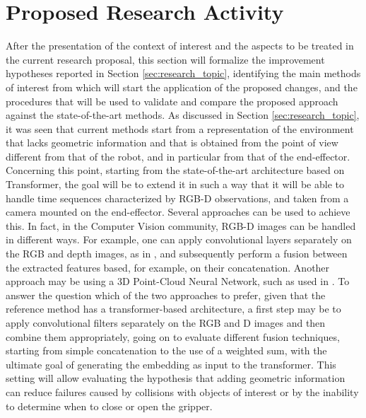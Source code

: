 \section{Proposed Research Activity}
\label{sec:research_activity}
After the presentation of the context of interest and the aspects to be treated in the current research proposal, this section will formalize the improvement hypotheses reported in Section \ref{sec:research_topic}, identifying the main methods of interest from which will start the application of the proposed changes, and the procedures that will be used to validate and compare the proposed approach against the state-of-the-art methods.
\newline As discussed in Section \ref{sec:research_topic}, it was seen that current methods start from a representation of the environment that lacks geometric information and that is obtained from the point of view different from that of the robot, and in particular from that of the end-effector. 
Concerning this point, starting from the state-of-the-art architecture \cite{mandi2022towards_more_generalizable_one_shot} based on Transformer, the goal will be to extend it in such a way that it will be able to handle time sequences characterized by RGB-D observations, and taken from a camera mounted on the end-effector. Several approaches can be used to achieve this. In fact, in the Computer Vision community, RGB-D images can be handled in different ways. For example, one can apply convolutional layers separately on the RGB and depth images, as in \cite{zhang2018deep_vr_teleoperation}, and subsequently perform a fusion between the extracted features based, for example, on their concatenation. Another approach may be using a 3D Point-Cloud Neural Network, such as \cite{qi2017pointnet++} used in \cite{fang2020graspnet}. To answer the question which of the two approaches to prefer, given that the reference method \cite{mandi2022towards_more_generalizable_one_shot} has a transformer-based architecture, a first step may be to apply convolutional filters separately on the RGB and D images and then combine them appropriately, going on to evaluate different fusion techniques, starting from simple concatenation to the use of a weighted sum, with the ultimate goal of generating the embedding as input to the transformer.
\newline This setting will allow evaluating the hypothesis that adding geometric information can reduce failures caused by collisions with objects of interest or by the inability to determine when to close or open the gripper.  

